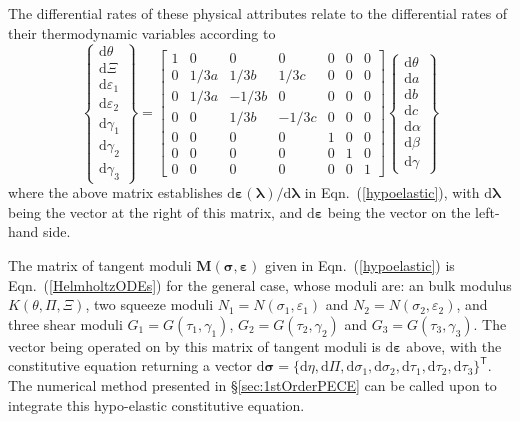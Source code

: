 The differential rates of these physical attributes relate to the differential rates of their thermo\-dynamic variables according to
\begin{equation}
    \left\{ \begin{matrix}
    \mathrm{d} \theta \\ \mathrm{d} \Xi \\ \mathrm{d} \varepsilon_1 \\
    \mathrm{d} \varepsilon_2 \\ \mathrm{d} \gamma_1 \\ \mathrm{d} \gamma_2 \\
    \mathrm{d} \gamma_3
    \end{matrix} \right\} = \begin{bmatrix}
    1 & 0 & 0 & 0 & 0 & 0 & 0 \\
    0 & 1/3a & 1/3b & 1/3c & 0 & 0 & 0 \\
    0 & 1/3a & -1/3b & 0 & 0 & 0 & 0 \\
    0 & 0 & 1/3b & -1/3c & 0 & 0 & 0 \\
    0 & 0 & 0 & 0 & 1 & 0 & 0 \\
    0 & 0 & 0 & 0 & 0 & 1 & 0 \\
    0 & 0 & 0 & 0 & 0 & 0 & 1
    \end{bmatrix} \left\{ \begin{matrix}
    \mathrm{d} \theta \\ \mathrm{d} a \\ \mathrm{d} b \\ \mathrm{d} c \\
    \mathrm{d} \alpha \\ \mathrm{d} \beta \\ \mathrm{d} \gamma
    \end{matrix} \right\}
\end{equation}
where the above matrix establishes $\mathrm{d} \boldsymbol{\varepsilon} ( \boldsymbol{\lambda} ) / \mathrm{d} \boldsymbol{\lambda}$ in Eqn.~(\ref{hypoelastic}), with $\mathrm{d} \boldsymbol{\lambda}$ being the vector at the right of this matrix, and $\mathrm{d} \boldsymbol{\varepsilon}$ being the vector on the left-hand side. 

The matrix of tangent moduli $\mathbf{M} ( \boldsymbol{\sigma} , \boldsymbol{\varepsilon} )$ given in Eqn.~(\ref{hypoelastic}) is Eqn.~(\ref{HelmholtzODEs}) for the general case, whose moduli are: an bulk modulus $K(\theta , \Pi , \Xi)$, two squeeze moduli $N_1 = N ( \sigma_1 , \varepsilon_1 )$ and $N_2 = N ( \sigma_2 , \varepsilon_2 )$, and three shear moduli $G_1 = G ( \tau_1 , \gamma_1 )$, $G_2 = G ( \tau_2 , \gamma_2 )$ and $G_3 = G ( \tau_3 , \gamma_3 )$.  The vector being operated on by this matrix of tangent moduli is $\mathrm{d} \boldsymbol{\varepsilon}$ above, with the constitutive equation returning a vector $\mathrm{d} \boldsymbol{\sigma} = \{ \mathrm{d} \eta , \mathrm{d} \Pi , \mathrm{d} \sigma_1 , \mathrm{d} \sigma_2 , \mathrm{d} \tau_1 , \mathrm{d} \tau_2 , \mathrm{d} \tau_3 \}^{\mathsf{T}}$.  The numerical method presented in \S\ref{sec:1stOrderPECE} can be called upon to integrate this hypo-elastic constitutive equation.  

